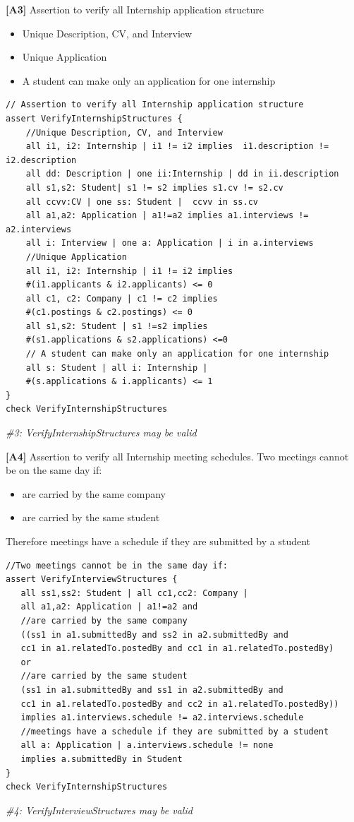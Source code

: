 \textbf{[A3]} Assertion to verify all Internship application structure
\begin{itemize}
    \item Unique Description, CV, and Interview 
    \item Unique Application
    \item A student can make only an application for one internship
\end{itemize}
\begin{lstlisting}
// Assertion to verify all Internship application structure
assert VerifyInternshipStructures {
    //Unique Description, CV, and Interview 
    all i1, i2: Internship | i1 != i2 implies  i1.description != i2.description
    all dd: Description | one ii:Internship | dd in ii.description
    all s1,s2: Student| s1 != s2 implies s1.cv != s2.cv
    all ccvv:CV | one ss: Student |  ccvv in ss.cv
    all a1,a2: Application | a1!=a2 implies a1.interviews != a2.interviews
    all i: Interview | one a: Application | i in a.interviews
    //Unique Application
    all i1, i2: Internship | i1 != i2 implies 
    #(i1.applicants & i2.applicants) <= 0
    all c1, c2: Company | c1 != c2 implies 
    #(c1.postings & c2.postings) <= 0
    all s1,s2: Student | s1 !=s2 implies 
    #(s1.applications & s2.applications) <=0
    // A student can make only an application for one internship
    all s: Student | all i: Internship | 
    #(s.applications & i.applicants) <= 1
}
check VerifyInternshipStructures
\end{lstlisting}
\textit{\#3: VerifyInternshipStructures may be valid}


\textbf{[A4]} Assertion to verify all Internship meeting schedules. Two meetings cannot be on the same day if:
\begin{itemize}
    \item are carried by the same company
    \item are carried by the same student
\end{itemize}
Therefore meetings have a schedule if they are submitted by a student
\begin{lstlisting}
//Two meetings cannot be in the same day if:
assert VerifyInterviewStructures {
   all ss1,ss2: Student | all cc1,cc2: Company |
   all a1,a2: Application | a1!=a2 and
   //are carried by the same company
   ((ss1 in a1.submittedBy and ss2 in a2.submittedBy and
   cc1 in a1.relatedTo.postedBy and cc1 in a1.relatedTo.postedBy)
   or
   //are carried by the same student
   (ss1 in a1.submittedBy and ss1 in a2.submittedBy and
   cc1 in a1.relatedTo.postedBy and cc2 in a1.relatedTo.postedBy))
   implies a1.interviews.schedule != a2.interviews.schedule
   //meetings have a schedule if they are submitted by a student
   all a: Application | a.interviews.schedule != none 
   implies a.submittedBy in Student
}
check VerifyInternshipStructures
\end{lstlisting}
\textit{\#4: VerifyInterviewStructures may be valid}